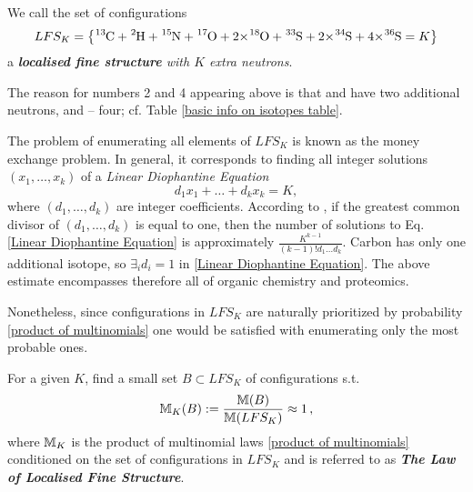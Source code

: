 \begin{mydef}\label{localised fine structure definition}
	We call the set of configurations  
	{\small
		\begin{equation}\label{LFS_K}
			LFS_K	=
			\left\{ 
				\cem{^{13}C} + \cem{^{2}H} +  \cem{^{15}N} +  \cem{^{17}O} +  \cem{2 $\times$^{18}O} +  \cem{^{33}S} +  \cem{2 $\times$^{34}S} + \cem{4 $\times$^{36}S} = K	
			\right\}
		\end{equation}
	}
	a \emph{\textbf{localised fine structure} with $K$ extra neutrons}.  	
\end{mydef}

The reason for numbers 2 and 4 appearing above is that  and  have two additional neutrons, and  -- four; cf. Table \ref{basic info on isotopes table}.

The problem of enumerating all elements of $LFS_K$ is known as the money exchange problem. In general, it corresponds to finding all integer solutions $(x_1, \dots, x_k)$ of a {\it Linear Diophantine Equation}  
\begin{equation}\label{Linear Diophantine Equation}
	d_1 x_1 + \dots + d_k x_k = K,
\end{equation}
where $(d_1, \dots, d_k)$ are integer coefficients. According to \cite{Agnarsson2002OnTheSylvesterDenumerants}, if the greatest common divisor of $(d_1, \dots, d_k)$ is equal to one, then the number of solutions to Eq. \eqref{Linear Diophantine Equation} is approximately $\frac{K^{k-1}}{(k-1)! d_1 \dots d_k}$. Carbon has only one additional isotope, so $\exists_i d_i = 1$ in \eqref{Linear Diophantine Equation}. The above estimate encompasses therefore all of organic chemistry and proteomics. 

Nonetheless, since configurations in $LFS_K$ are naturally prioritized by probability \eqref{product of multinomials} one would be satisfied with enumerating only the most probable ones. 


\begin{Problem}\label{Problem of finding LFS_K configurations.}
	For a given $K$, find a small set $B \subset LFS_K$ of configurations s.t. 
	\begin{equation}\label{problem equation}
		\mathbb{M}_K (B) := \frac{ \mathbb{M}(B) }{ \mathbb{M}( LFS_K ) } \approx 1\,,	
	\end{equation} 
	where $\mathbb{M}_K$ is the product of multinomial laws \eqref{product of multinomials} conditioned on the set of configurations in $LFS_K$ and is referred to as \emph{\textbf{The Law of Localised Fine Structure}}.
\end{Problem}


